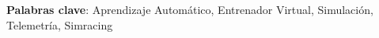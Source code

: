 



\bigskip
\noindent\textbf{Palabras clave}: Aprendizaje Automático, Entrenador Virtual, Simulación, Telemetría, Simracing %

\cleardoublepage %





